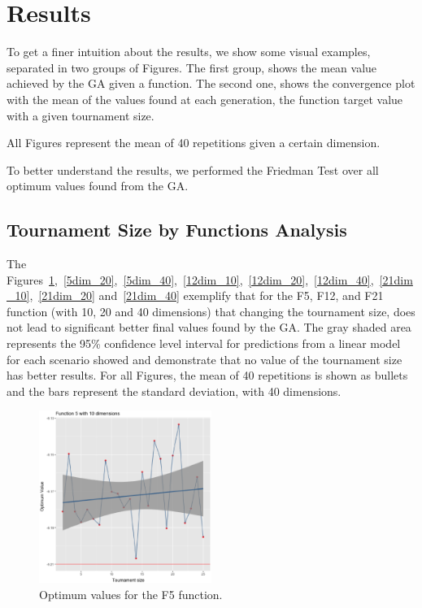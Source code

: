 \section{Results}\label{sec:results}

To get a finer intuition about the results, we show  some visual examples, separated in two groups of Figures. The first group, shows the mean value achieved by the GA given a function. The second one, shows the convergence plot with the mean of the values found at each generation, the function target value with a given tournament size.

All Figures represent the mean of 40 repetitions given a certain dimension.

To better understand the results, we performed the Friedman Test over all optimum values found from the GA.%




\subsection{Tournament Size by Functions Analysis}
The Figures~\ref{5dim_10},~\ref{5dim_20},~\ref{5dim_40},~\ref{12dim_10},~\ref{12dim_20},~\ref{12dim_40},~\ref{21dim_10},~\ref{21dim_20} and~\ref{21dim_40} exemplify that for the F5, F12, and F21 function (with 10, 20 and 40 dimensions) that changing the tournament size, does not lead to significant better final values found by the GA. The gray shaded area represents the 95\% confidence level interval for predictions from a linear model for each scenario showed and demonstrate that no value of the tournament size has better results. For all Figures, the mean of 40 repetitions is shown as bullets and the bars represent the standard deviation, with 40 dimensions. 


\begin{figure}[!ht]
	\includegraphics[width=0.5\textwidth]{img/5dim_10.ps}
	\caption{Optimum values for the F5 function.}
	\label{5dim_10}
\end{figure}

